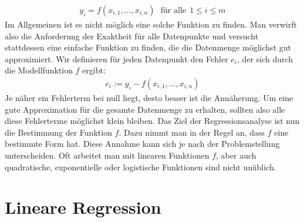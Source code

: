 \begin{align*}
    y_i = f(x_{i, 1}, \dots, x_{i, n}) ~~~\text{für alle}~~ 1 \leq i \leq m
\end{align*}
Im Allgemeinen ist es nicht möglich eine solche Funktion zu finden. Man verwirft also die Anforderung der Exaktheit für alle Datenpunkte und versucht stattdessen eine einfache Funktion zu finden, die die Datenmenge möglichst gut approximiert. Wir definieren für jeden Datenpunkt den Fehler $e_i$, der sich durch die Modellfunktion $f$ ergibt:
\begin{align*}
    e_i := y_i - f(x_{i, 1}, \dots, x_{i, n})
\end{align*}
Je näher ein Fehlerterm bei null liegt, desto besser ist die Annäherung. Um eine gute Approximation für die gesamte Datenmenge zu erhalten, sollten also alle diese Fehlerterme möglichst klein bleiben. Das Ziel der Regressionsanalyse ist nun die Bestimmung der Funktion $f$. Dazu nimmt man in der Regel an, dass $f$ eine bestimmte Form hat. Diese Annahme kann sich je nach der Problemstellung unterscheiden. Oft arbeitet man mit linearen Funktionen $f$, aber auch quadratische, exponentielle oder logistische Funktionen sind nicht unüblich.

\section{Lineare Regression}
\label{section:2:1}

